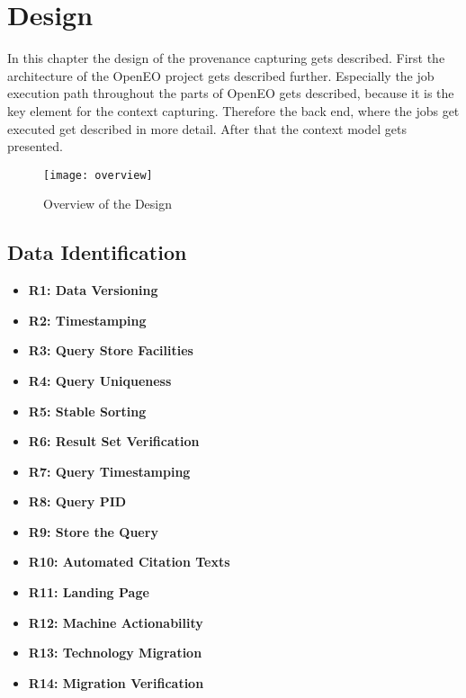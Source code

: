 \documentclass[draft,final]{vutinfth} %
\begin{document}
\chapter{Design}\label{Design}
In this chapter the design of the provenance capturing gets described. First the architecture of the OpenEO project gets described further. Especially the job execution path throughout the parts of OpenEO gets described, because it is the key element for the context capturing. Therefore the back end, where the jobs get executed get described in more detail. After that the context model gets presented. 

\begin{figure}[h]
	\centering
	\texttt{[image: overview]}
	\caption{Overview of the Design}
	\label{fig:overview} %
\end{figure}

\section{Data Identification}\label{Design:Data Identification}

\begin{itemize}
	\item \textbf{R1: Data Versioning}
	\item \textbf{R2: Timestamping}
	\item \textbf{R3: Query Store Facilities }
	\item \textbf{R4: Query Uniqueness}
	\item \textbf{R5: Stable Sorting}
	\item \textbf{R6: Result Set Verification}
	\item \textbf{R7: Query Timestamping}
	\item \textbf{R8: Query PID}
	\item \textbf{R9: Store the Query}
	\item \textbf{R10: Automated Citation Texts}
	\item \textbf{R11: Landing Page}
	\item \textbf{R12: Machine Actionability}
	\item \textbf{R13: Technology Migration}
	\item \textbf{R14: Migration Verification}
\end{itemize}
\end{document}
